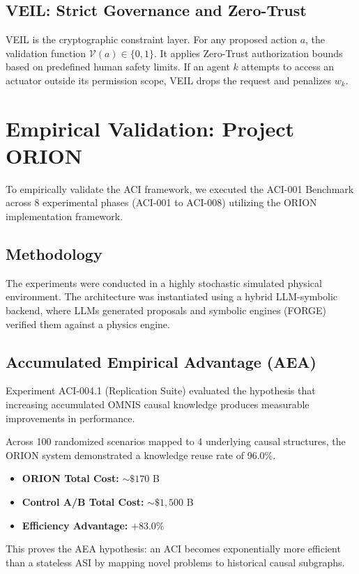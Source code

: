 \documentclass[12pt,a4paper]{article}
\begin{document}
\subsection{VEIL: Strict Governance and Zero-Trust}
VEIL is the cryptographic constraint layer. For any proposed action $a$, the validation function $\mathcal{V}(a) \in \{0, 1\}$. It applies Zero-Trust authorization bounds based on predefined human safety limits. If an agent $k$ attempts to access an actuator outside its permission scope, VEIL drops the request and penalizes $w_k$.

\section{Empirical Validation: Project ORION}
\label{sec:orion}
To empirically validate the ACI framework, we executed the ACI-001 Benchmark across 8 experimental phases (ACI-001 to ACI-008) utilizing the ORION implementation framework.

\subsection{Methodology}
The experiments were conducted in a highly stochastic simulated physical environment. The architecture was instantiated using a hybrid LLM-symbolic backend, where LLMs generated proposals and symbolic engines (FORGE) verified them against a physics engine.

\subsection{Accumulated Empirical Advantage (AEA)}
Experiment ACI-004.1 (Replication Suite) evaluated the hypothesis that increasing accumulated OMNIS causal knowledge produces measurable improvements in performance. 

Across 100 randomized scenarios mapped to 4 underlying causal structures, the ORION system demonstrated a knowledge reuse rate of 96.0\%. 
\begin{itemize}
    \item \textbf{ORION Total Cost:} $\sim \$170$ B
    \item \textbf{Control A/B Total Cost:} $\sim \$1,500$ B
    \item \textbf{Efficiency Advantage:} $+83.0\%$
\end{itemize}
This proves the AEA hypothesis: an ACI becomes exponentially more efficient than a stateless ASI by mapping novel problems to historical causal subgraphs.
\end{document}
